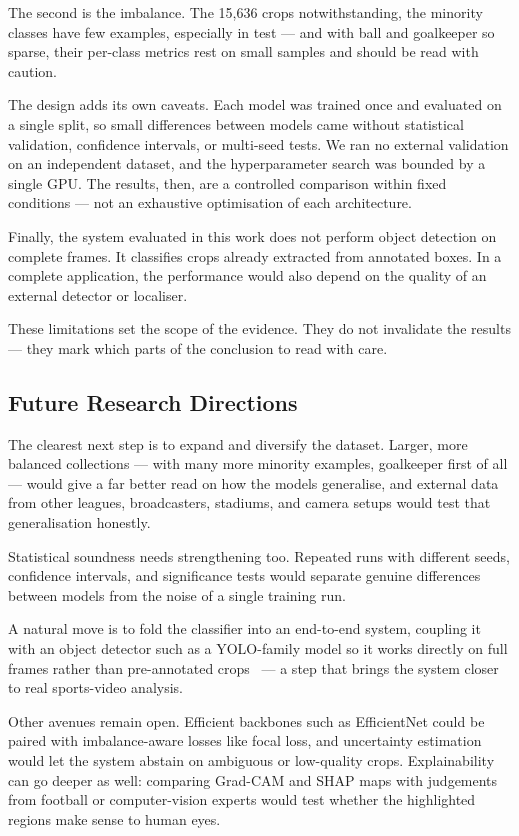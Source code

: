 \documentclass[preprint,12pt]{elsarticle}
\begin{document}
The second is the imbalance. The 15,636 crops notwithstanding, the minority classes have few examples, especially in test --- and with ball and goalkeeper so sparse, their per-class metrics rest on small samples and should be read with caution.

The design adds its own caveats. Each model was trained once and evaluated on a single split, so small differences between models came without statistical validation, confidence intervals, or multi-seed tests. We ran no external validation on an independent dataset, and the hyperparameter search was bounded by a single GPU. The results, then, are a controlled comparison within fixed conditions --- not an exhaustive optimisation of each architecture.

Finally, the system evaluated in this work does not perform object detection on complete frames. It classifies crops already extracted from annotated boxes. In a complete application, the performance would also depend on the quality of an external detector or localiser.

These limitations set the scope of the evidence. They do not invalidate the results --- they mark which parts of the conclusion to read with care.

\subsection{Future Research Directions}

The clearest next step is to expand and diversify the dataset. Larger, more balanced collections --- with many more minority examples, goalkeeper first of all --- would give a far better read on how the models generalise, and external data from other leagues, broadcasters, stadiums, and camera setups would test that generalisation honestly.

Statistical soundness needs strengthening too. Repeated runs with different seeds, confidence intervals, and significance tests would separate genuine differences between models from the noise of a single training run.

A natural move is to fold the classifier into an end-to-end system, coupling it with an object detector such as a YOLO-family model so it works directly on full frames rather than pre-annotated crops~\cite{liang2025basketball} --- a step that brings the system closer to real sports-video analysis.

Other avenues remain open. Efficient backbones such as EfficientNet could be paired with imbalance-aware losses like focal loss, and uncertainty estimation would let the system abstain on ambiguous or low-quality crops. Explainability can go deeper as well: comparing Grad-CAM and SHAP maps with judgements from football or computer-vision experts would test whether the highlighted regions make sense to human eyes.
\end{document}
